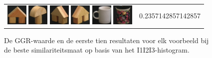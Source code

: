 \begin{figure}[tbp]
\begin{center}
\begin{tabular}{m{11cm} | m{3cm} |}
\includegraphics[width=1cm]{coil/beeld-43.eps} 
\includegraphics[width=1cm]{coil/beeld-3.eps} 
\includegraphics[width=1cm]{coil/beeld-46.eps} 
\includegraphics[width=1cm]{coil/beeld-45.eps} 
\includegraphics[width=1cm]{coil/beeld-37.eps} 
\includegraphics[width=1cm]{coil/beeld-62.eps} & {\scriptsize 
0.2357142857142857}
\end{tabular}
\caption{\label{fig:results_i1i2i3_histgeb}De GGR-waarde en de eerste tien resultaten voor elk voorbeeld bij de beste similariteitsmaat op basis van het I1I2I3-histogram.}
\end{center}
\end{figure}

